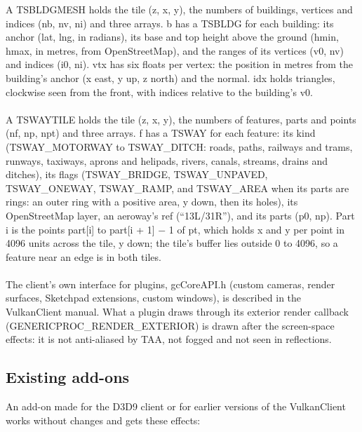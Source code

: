 \documentclass[Orbiter Developer Manual.tex]{subfiles}
\begin{document}
\begin{sloppypar}
\noindent
A TSBLDGMESH holds the tile (z, x, y), the numbers of buildings, vertices and indices (nb, nv, ni) and three arrays. b has a TSBLDG for each building: its anchor (lat, lng, in radians), its base and top height above the ground (hmin, hmax, in metres, from OpenStreetMap), and the ranges of its vertices (v0, nv) and indices (i0, ni). vtx has six floats per vertex: the position in metres from the building's anchor (x east, y up, z north) and the normal. idx holds triangles, clockwise seen from the front, with indices relative to the building's v0.\\
\\
A TSWAYTILE holds the tile (z, x, y), the numbers of features, parts and points (nf, np, npt) and three arrays. f has a TSWAY for each feature: its kind (TSWAY\_MOTORWAY to TSWAY\_DITCH: roads, paths, railways and trams, runways, taxiways, aprons and helipads, rivers, canals, streams, drains and ditches), its flags (TSWAY\_BRIDGE, TSWAY\_UNPAVED, TSWAY\_ONEWAY, TSWAY\_RAMP, and TSWAY\_AREA when its parts are rings: an outer ring with a positive area, y down, then its holes), its OpenStreetMap layer, an aeroway's ref (``13L/31R''), and its parts (p0, np). Part i is the points part[i] to part[i + 1] $-$ 1 of pt, which holds x and y per point in 4096 units across the tile, y down; the tile's buffer lies outside 0 to 4096, so a feature near an edge is in both tiles.\\
\\
The client's own interface for plugins, gcCoreAPI.h (custom cameras, render surfaces, Sketchpad extensions, custom windows), is described in the VulkanClient manual. What a plugin draws through its exterior render callback (GENERICPROC\_RENDER\_EXTERIOR) is drawn after the screen-space effects: it is not anti-aliased by TAA, not fogged and not seen in reflections.


\subsection{Existing add-ons}
\label{ssec:vk_existing}
An add-on made for the D3D9 client or for earlier versions of the VulkanClient works without changes and gets these effects:


\end{sloppypar}
\end{document}
